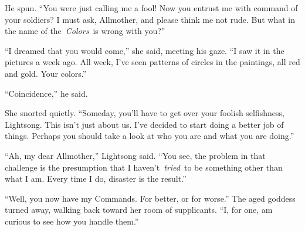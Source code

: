 He spun. “You were just calling me a fool! Now you entrust me with command of your soldiers? I must ask, Allmother, and please think me not rude. But what in the name of the~\textit{Colors}~is wrong with you?”

“I dreamed that you would come,” she said, meeting his gaze. “I saw it in the pictures a week ago. All week, I’ve seen patterns of circles in the paintings, all red and gold. Your colors.”

“Coincidence,” he said.

She snorted quietly. “Someday, you’ll have to get over your foolish selfishness, Lightsong. This isn’t just about us. I’ve decided to start doing a better job of things. Perhaps you should take a look at who you are and what you are doing.”

“Ah, my dear Allmother,” Lightsong said. “You see, the problem in that challenge is the presumption that I haven’t~\textit{tried}~to be something other than what I am. Every time I do, disaster is the result.”

“Well, you now have my Commands. For better, or for worse.” The aged goddess turned away, walking back toward her room of supplicants. “I, for one, am curious to see how you handle them.”

